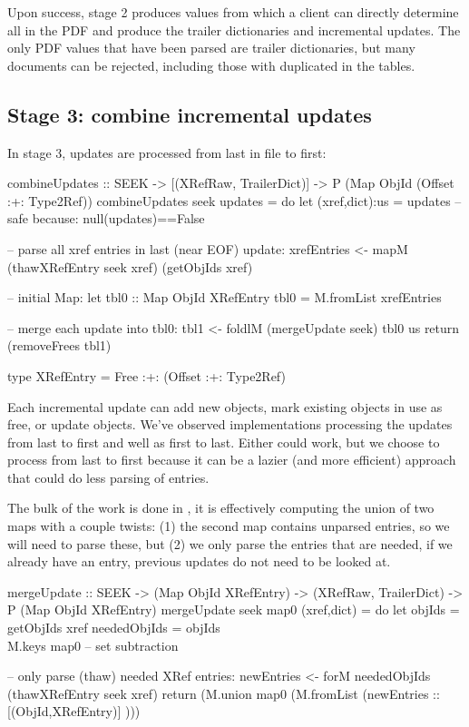 Upon success, stage 2 produces values from which a client can directly determine all \objids{} in the PDF and produce the trailer dictionaries and incremental updates.
%
The only PDF values that have been parsed are trailer dictionaries, but many documents can be rejected, including those with duplicated \objids{} in the \xref{} tables.

\subsection{Stage 3: combine incremental updates}
\label{sec:stage-3}
%
In stage 3, updates are processed from last in file to first:
\begin{code}
combineUpdates :: SEEK
               -> [(XRefRaw, TrailerDict)] 
               -> P (Map ObjId (Offset :+: Type2Ref))
combineUpdates seek updates =
    do
    let (xref,dict):us = updates -- safe because: null(updates)==False

    -- parse all xref entries in last (near EOF) update:
    xrefEntries <- mapM (thawXRefEntry seek xref) (getObjIds xref)

    -- initial Map:
    let tbl0 :: Map ObjId XRefEntry
        tbl0 = M.fromList xrefEntries

    -- merge each update into tbl0:
    tbl1  <- foldlM (mergeUpdate seek) tbl0 us
    return (removeFrees tbl1)

type XRefEntry = Free :+: (Offset :+: Type2Ref)
\end{code}

Each incremental update can add new objects, mark existing objects in use as free, or update objects.
We've observed implementations processing the updates from last to first and well as first to last.
Either could work, but we choose to process from last to first because it can be a lazier 
(and more efficient)
approach that could do less parsing of  entries.

The bulk of the work is done in , 
it is effectively computing the union of two maps with a couple twists:
(1) the second map  contains unparsed \xref{} entries,
so we will need to parse these, but
(2) we only parse the \xref{} entries that are needed, if we already have
an entry, previous updates do not need to be looked at.

\begin{code}
mergeUpdate :: SEEK
            ->  (Map ObjId XRefEntry)
            -> (XRefRaw, TrailerDict)
            -> P (Map ObjId XRefEntry)
mergeUpdate seek map0 (xref,dict) =
    do
    let objIds       = getObjIds xref
        neededObjIds = objIds \\ M.keys map0
                       -- set subtraction

    -- only parse (thaw) needed XRef entries:
    newEntries <- forM neededObjIds
                       (thawXRefEntry seek xref)
    return
      (M.union map0 (M.fromList (newEntries :: [(ObjId,XRefEntry)] )))
\end{code}


